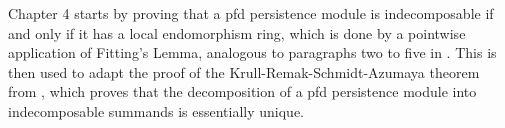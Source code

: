 Chapter 4 starts by proving that a pfd persistence module is indecomposable if and only if it has a local endomorphism ring, which is done by a pointwise application of Fitting's Lemma, analogous to paragraphs two to five in \cite[Section 3]{BotnanCrawley_2018}.
This is then used to adapt the proof of the Krull-Remak-Schmidt-Azumaya theorem from \cite[Section 5.1]{popescu_1973}, which proves that the decomposition of a pfd persistence module into indecomposable summands is essentially unique.